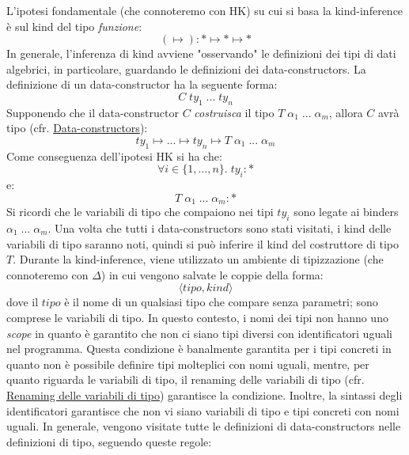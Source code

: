 \documentclass[10pt,a4paper]{article}
\begin{document}
L'ipotesi fondamentale (che connoteremo con HK) su cui si basa la kind-inference è sul kind del tipo \textit{funzione}:
\[ (\mapsto) : * \mapsto * \mapsto * \]
In generale, l'inferenza di kind avviene "osservando" le definizioni dei tipi di dati algebrici, in particolare,
guardando le definizioni dei data-constructors. La definizione di un data-constructor ha la seguente forma:
\[ C \; ty_1 \; ... \; ty_n \]
Supponendo che il data-constructor $ C $ \textit{costruisca} il tipo $ T \; \alpha_1 \; ... \; \alpha_m $, allora
$ C $ avrà tipo (cfr. \hyperlink{Data-constructors}{Data-constructors}):
\[ ty_1 \mapsto ... \mapsto ty_n \mapsto T \; \alpha_1 \; ... \; \alpha_m \]
Come conseguenza dell'ipotesi HK si ha che:
\[ \forall i \in \{ 1, ..., n \}. \; ty_i : * \]
e:
\[ T \; \alpha_1 \; ... \; \alpha_m : * \]
Si ricordi che le variabili di tipo che compaiono nei tipi $ ty_i $ sono legate ai binders
$ \alpha_1 \; ... \; \alpha_m $. Una volta che tutti i data-constructors sono stati visitati, i kind delle variabili di
tipo saranno noti, quindi si può inferire il kind del costruttore di tipo $ T $. Durante la kind-inference, viene
utilizzato un ambiente di tipizzazione (che connoteremo con $ \Delta $) in cui vengono salvate le coppie della forma:
\[ \langle tipo, kind \rangle \]
dove il $ tipo $ è il nome di un qualsiasi tipo che compare senza parametri; sono comprese le variabili di tipo.
In questo contesto, i nomi dei tipi non hanno uno \textit{scope} in quanto è garantito che non ci siano tipi diversi con
identificatori uguali nel programma.
Questa condizione è banalmente garantita per i tipi concreti in quanto non è possibile definire tipi molteplici con nomi
uguali, mentre, per quanto riguarda le variabili di tipo, il renaming
delle variabili di tipo (cfr. \hyperlink{Renaming delle variabili di tipo}{Renaming delle variabili di tipo}) garantisce
la condizione. Inoltre, la sintassi degli
identificatori garantisce che non vi siano variabili di tipo e tipi concreti con nomi uguali.
In generale, vengono visitate tutte le definizioni di data-constructors nelle definizioni di tipo, seguendo queste regole:
\end{document}
